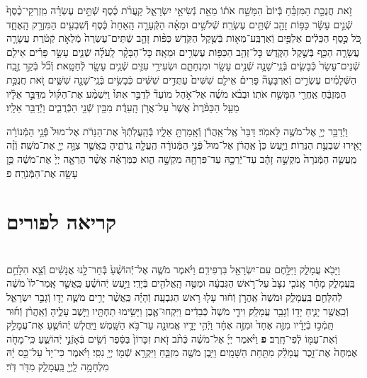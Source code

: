 \documentclass[twoside, openany, parskip=half, 11pt]{book}
\begin{document}
\begin{footnotesize}
\begin{multicols}{2}
זֹ֣את חֲנֻכַּ֣ת הַמִּזְבֵּ֗חַ בְּֿיוֹם֙ הִמָּשַׁ֣ח אֹת֔וֹ מֵאֵ֖ת נְֿשִׂיאֵ֣י יִשְׂרָאֵ֑ל קַֽעֲרֹ֨ת כֶּ֜סֶף שְֿׁתֵּ֣ים עֶשְׂרֵ֗ה מִֽזְרְקֵי־כֶ֨סֶף֙ שְֿׁנֵ֣ים עָשָׂ֔ר כַּפּ֥וֹת זָהָ֖ב שְֿׁתֵּ֥ים עֶשְׂרֵֽה׃ שְֿׁלֹשִׁ֣ים וּמֵאָ֗ה הַקְּֿעָרָ֤ה הָֽאַחַת֙ כֶּ֔סֶף וְֿשִׁבְעִ֖ים הַמִּזְרָ֣ק הָֽאֶחָ֑ד כֹּ֚ל כֶּ֣סֶף הַכֵּלִ֔ים אַלְפַּ֥יִם וְֿאַרְבַּֽע־מֵא֖וֹת בְּֿשֶׁ֥קֶל הַקֹּֽדֶשׁ׃ כַּפּ֨וֹת זָהָ֤ב שְֿׁתֵּים־עֶשְׂרֵה֙ מְֿלֵאֹ֣ת קְֿטֹ֔רֶת עֲשָׂרָ֧ה עֲשָׂרָ֛ה הַכַּ֖ף בְּֿשֶׁ֣קֶל הַקֹּ֑דֶשׁ כׇּל־זְהַ֥ב הַכַּפּ֖וֹת עֶשְׂרִ֥ים וּמֵאָֽה׃ כׇּל־הַבָּקָ֨ר לָֽעֹלָ֜ה שְֿׁנֵ֧ים עָשָׂ֣ר פָּרִ֗ים אֵילִ֤ם שְֿׁנֵים־עָשָׂר֙ כְּֿבָשִׂ֧ים בְּֿנֵֽי־שָׁנָ֛ה שְֿׁנֵ֥ים עָשָׂ֖ר וּמִנְחָתָ֑ם וּשְׂעִירֵ֥י עִזִּ֛ים שְֿׁנֵ֥ים עָשָׂ֖ר לְֿחַטָּֽאת׃ וְֿכֹ֞ל בְּֿקַ֣ר זֶ֣בַֽח הַשְּֿׁלָמִ֗ים עֶשְׂרִ֣ים וְֿאַרְבָּעָה֘ פָּרִים֒ אֵילִ֤ם שִׁשִּׁים֙ עַתֻּדִ֣ים שִׁשִּׁ֔ים כְּֿבָשִׂ֥ים בְּֿנֵֽי־שָׁנָ֖ה שִׁשִּׁ֑ים זֹ֚את חֲנֻכַּ֣ת הַמִּזְבֵּ֔חַ אַֽחֲרֵ֖י הִמָּשַׁ֥ח אֹתֽוֹ׃ וּבְבֹ֨א מֹשֶׁ֜ה אֶל־אֹ֣הֶל מוֹעֵד֘ לְֿדַבֵּ֣ר אִתּוֹ֒ וַיִּשְׁמַ֨ע אֶת־הַקּ֜וֹל מִדַּבֵּ֣ר אֵלָ֗יו מֵעַ֤ל הַכַּפֹּ֨רֶת֙ אֲשֶׁר֙ עַל־אֲרֹ֣ן הָֽעֵדֻ֔ת מִבֵּ֖ין שְֿׁנֵ֣י הַכְּֿרֻבִ֑ים וַיְֿדַבֵּ֖ר אֵלָֽיו׃

וַיְֿדַבֵּ֥ר יְיָ֖ אֶל־מֹשֶׁ֥ה לֵּאמֹֽר׃ דַּבֵּר֙ אֶֽל־אַֽהֲרֹ֔ן וְֿאָֽמַרְתָּ֖ אֵלָ֑יו בְּֿהַֽעֲלֹֽתְֿךָ֙ אֶת־הַנֵּרֹ֔ת אֶל־מוּל֙ פְּֿנֵ֣י הַמְּֿנוֹרָ֔ה יָאִ֖ירוּ שִׁבְעַ֥ת הַנֵּרֽוֹת׃ וַיַּ֤עַשׂ כֵּן֙ אַֽהֲרֹ֔ן אֶל־מוּל֙ פְּֿנֵ֣י הַמְּֿנוֹרָ֔ה הֶֽעֱלָ֖ה נֵֽרֹתֶ֑יהָ כַּֽאֲשֶׁ֛ר צִוָּ֥ה יְיָ֖ אֶת־מֹשֶֽׁה׃ וְֿזֶ֨ה מַֽעֲשֵׂ֤ה הַמְּֿנֹרָה֙ מִקְשָׁ֣ה זָהָ֔ב עַד־יְֿרֵכָ֥הּ עַד־פִּרְחָ֖הּ מִקְשָׁ֣ה הִ֑וא כַּמַּרְאֶ֗ה אֲשֶׁ֨ר הֶרְאָ֤ה יְיָ֙ אֶת־מֹשֶׁ֔ה כֵּ֥ן עָשָׂ֖ה אֶת־הַמְּֿנֹרָֽה׃ פ

\end{multicols}

\section[פורים]{קריאה לפורים}


\begin{multicols}{2}
\\
וַיָּבֹ֖א עֲמָלֵ֑ק וַיִּלָּ֥חֶם עִם־יִשְׂרָאֵ֖ל בִּרְפִידִֽם׃ וַיֹּ֨אמֶר מֹשֶׁ֤ה אֶל־יְֿהוֹשֻׁ֨עַ֙ בְּֿחַר־לָ֣נוּ אֲנָשִׁ֔ים וְֿצֵ֖א הִלָּחֵ֣ם בַּֽעֲמָלֵ֑ק מָחָ֗ר אָֽנֹכִ֤י נִצָּב֙ עַל־רֹ֣אשׁ הַגִּבְעָ֔ה וּמַטֵּ֥ה הָֽאֱלֹהִ֖ים בְּֿיָדִֽי׃ וַיַּ֣עַשׂ יְֿהוֹשֻׁ֗עַ כַּֽאֲשֶׁ֤ר אָֽמַר־לוֹ֙ מֹשֶׁ֔ה לְֿהִלָּחֵ֖ם בַּֽעֲמָלֵ֑ק וּמֹשֶׁה֙ אַֽהֲרֹ֣ן וְֿח֔וּר עָל֖וּ רֹ֥אשׁ הַגִּבְעָֽה׃ 
וְֿהָיָ֗ה כַּֽאֲשֶׁ֨ר יָרִ֥ים מֹשֶׁ֛ה יָד֖וֹ וְֿגָבַ֣ר יִשְׂרָאֵ֑ל וְֿכַֽאֲשֶׁ֥ר יָנִ֛יחַ יָד֖וֹ וְֿגָבַ֥ר עֲמָלֵֽק׃ וִידֵ֤י מֹשֶׁה֙ כְּֿבֵדִ֔ים וַיִּקְחוּ־אֶ֛בֶן וַיָּשִׂ֥ימוּ תַחְתָּ֖יו וַיֵּ֣שֶׁב עָלֶ֑יהָ וְֿאַֽהֲרֹ֨ן וְֿח֜וּר תָּֽמְֿכ֣וּ בְֿיָדָ֗יו מִזֶּ֤ה אֶחָד֙ וּמִזֶּ֣ה אֶחָ֔ד וַיְֿהִ֥י יָדָ֛יו אֱמוּנָ֖ה עַד־בֹּ֥א הַשָּֽׁמֶשׁ׃ וַיַּֽחֲל֧שׁ יְֿהוֹשֻׁ֛עַ אֶת־עֲמָלֵ֥ק וְֿאֶת־עַמּ֖וֹ לְֿפִי־חָֽרֶב׃ \textbf{פ}
וַיֹּ֨אמֶר יְיָ֜ אֶל־מֹשֶׁ֗ה כְּֿתֹ֨ב זֹ֤את זִכָּרוֹן֙ בַּסֵּ֔פֶר וְֿשִׂ֖ים בְּֿאָזְֿנֵ֣י יְֿהוֹשֻׁ֑עַ כִּֽי־מָחֹ֤ה אֶמְחֶה֙ אֶת־זֵ֣כֶר עֲמָלֵ֔ק מִתַּ֖חַת הַשָּׁמָֽיִם׃ וַיִּ֥בֶן מֹשֶׁ֖ה מִזְבֵּ֑חַ וַיִּקְרָ֥א שְֿׁמ֖וֹ יְיָ֥ נִסִּֽי׃ וַיֹּ֗אמֶר כִּי־יָד֙ עַל־כֵּ֣ס יָ֔הּ מִלְחָמָ֥ה לַֽיְיָ֖ בַּֽעֲמָלֵ֑ק מִדֹּ֖ר דֹּֽר׃


\end{multicols}
\end{footnotesize}
\end{document}
